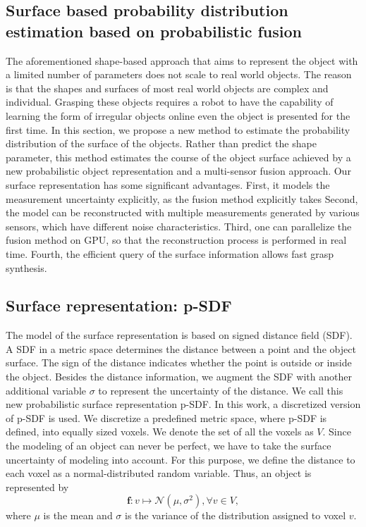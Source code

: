 \subsection{Surface based probability distribution estimation based on probabilistic fusion}
The aforementioned shape-based approach that aims to represent the object with a limited number of parameters does not scale to real world objects. The reason is that the shapes and surfaces of most real world objects are complex and individual. Grasping these objects requires a robot to have the capability of learning the form of irregular objects online even the object is presented for the first time. In this section, we propose a new method to estimate the probability distribution of the surface of the objects. Rather than predict the shape parameter, this method estimates the course of the object surface achieved by a new probabilistic object representation and a multi-sensor fusion approach. Our surface representation has some significant advantages. First, it models the measurement uncertainty explicitly, as the fusion method explicitly takes Second, the model can be reconstructed with multiple measurements generated by various sensors, which have different noise characteristics. Third, one can parallelize the fusion method on GPU, so that the reconstruction
process is performed in real time. Fourth, the efficient query of the surface information allows fast grasp synthesis.

\subsection{Surface representation: p-SDF}
The model of the surface representation is based on signed distance field (SDF). A SDF in a metric space determines the distance between a point and the object surface. The sign of the distance indicates whether the point is outside or inside the object. Besides the distance information, we augment the SDF with another additional variable $\sigma$ to represent the uncertainty of the distance. We call this new probabilistic surface representation p-SDF. In this work, a discretized version of p-SDF is used. We discretize a predefined metric space, where p-SDF is defined, into equally sized voxels. We denote the set of all the voxels as $V$. Since the modeling of an object can never be perfect, we have to take the surface uncertainty of modeling into account. For this purpose, we define the distance to each voxel as a normal-distributed random variable. Thus, an object is represented by  
\begin{equation}
\bm{f}: v \mapsto \mathcal{N}(\mu, \sigma^2),  \forall v \in  V ,
\end{equation}
where $\mu$ is the mean and $\sigma$ is the variance of the distribution assigned to voxel $v$.  

